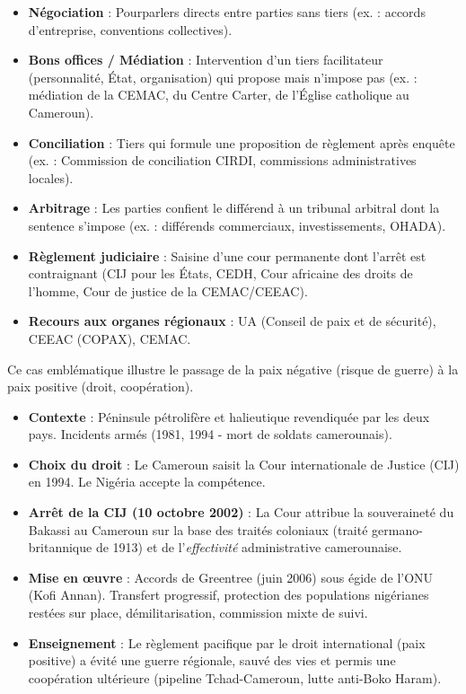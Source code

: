 \documentclass[11pt]{article}
\newcommand{\cle}[1]{{\popxbold\color{popdark}#1}}
\begin{document}
\begin{definition}
\begin{itemize}
    \item \textbf{Négociation} : Pourparlers directs entre parties sans tiers (ex. : accords d'entreprise, conventions collectives).
    \item \textbf{Bons offices / Médiation} : Intervention d'un tiers facilitateur (personnalité, État, organisation) qui propose mais n'impose pas (ex. : médiation de la CEMAC, du Centre Carter, de l'Église catholique au Cameroun).
    \item \textbf{Conciliation} : Tiers qui formule une proposition de règlement après enquête (ex. : Commission de conciliation CIRDI, commissions administratives locales).
    \item \textbf{Arbitrage} : Les parties confient le différend à un tribunal arbitral dont la sentence s'impose (ex. : différends commerciaux, investissements, OHADA).
    \item \textbf{Règlement judiciaire} : Saisine d'une cour permanente dont l'arrêt est contraignant (CIJ pour les États, CEDH, Cour africaine des droits de l'homme, Cour de justice de la CEMAC/CEEAC).
    \item \textbf{Recours aux organes régionaux} : UA (Conseil de paix et de sécurité), CEEAC (COPAX), CEMAC.
\end{itemize}
\end{definition}

\begin{exemplebox}
Ce cas emblématique illustre le passage de la paix négative (risque de guerre) à la paix positive (droit, coopération).
\begin{itemize}
    \item \textbf{Contexte} : Péninsule pétrolifère et halieutique revendiquée par les deux pays. Incidents armés (1981, 1994 - mort de soldats camerounais).
    \item \textbf{Choix du droit} : Le Cameroun saisit la \cle{Cour internationale de Justice (CIJ)} en 1994. Le Nigéria accepte la compétence.
    \item \textbf{Arrêt de la CIJ (10 octobre 2002)} : La Cour attribue la souveraineté du Bakassi au Cameroun sur la base des traités coloniaux (traité germano-britannique de 1913) et de l'\emph{effectivité} administrative camerounaise.
    \item \textbf{Mise en œuvre} : Accords de \cle{Greentree} (juin 2006) sous égide de l'ONU (Kofi Annan). Transfert progressif, protection des populations nigérianes restées sur place, démilitarisation, commission mixte de suivi.
    \item \textbf{Enseignement} : Le règlement pacifique par le droit international (paix positive) a évité une guerre régionale, sauvé des vies et permis une coopération ultérieure (pipeline Tchad-Cameroun, lutte anti-Boko Haram).
\end{itemize}
\end{exemplebox}
\end{document}
